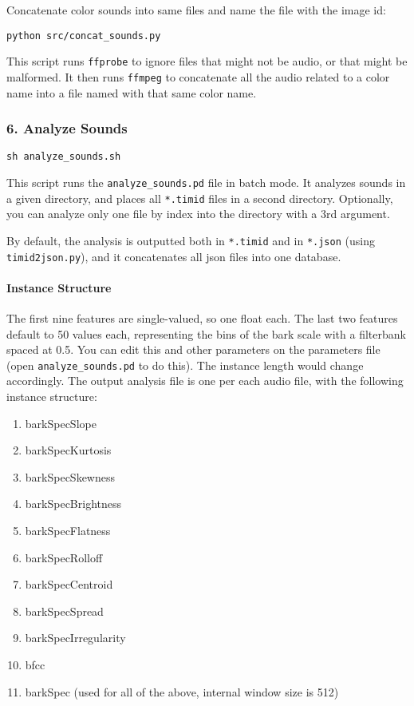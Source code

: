 Concatenate color sounds into same files and name the file with the image id:

\texttt{python\ src/concat\_sounds.py}

This script runs \texttt{ffprobe} to ignore files that might not be audio, or that might be malformed. It then runs \texttt{ffmpeg} to concatenate all the audio related to a color name into a file named with that same color name.




\subsubsection{6. Analyze Sounds}

\texttt{sh\ analyze\_sounds.sh}

This script runs the \texttt{analyze\_sounds.pd} file in batch mode. It analyzes sounds in a given directory, and places all \texttt{*.timid} files in a second directory. Optionally, you can analyze only one file by index into the directory with a 3rd argument.

By default, the analysis is outputted both in \texttt{*.timid} and in \texttt{*.json} (using \texttt{timid2json.py}), and it concatenates all \gls{json} files into one database.


\paragraph{Instance Structure}

The first nine features are single-valued, so one float each. The last two features default to 50 values each, representing the bins of the bark scale with a filterbank spaced at 0.5. You can edit this and other parameters on the parameters file (open \texttt{analyze\_sounds.pd} to do this). The instance length would change accordingly. The output analysis file is one per each audio file, with the following instance structure:

\begin{enumerate}
\def\labelenumi{\arabic{enumi}.}
\tightlist
\item
  barkSpecSlope
\item
  barkSpecKurtosis
\item
  barkSpecSkewness
\item
  barkSpecBrightness
\item
  barkSpecFlatness
\item
  barkSpecRolloff
\item
  barkSpecCentroid
\item
  barkSpecSpread
\item
  barkSpecIrregularity
\item
  bfcc
\item
  barkSpec (used for all of the above, internal window size is 512)
\end{enumerate}

